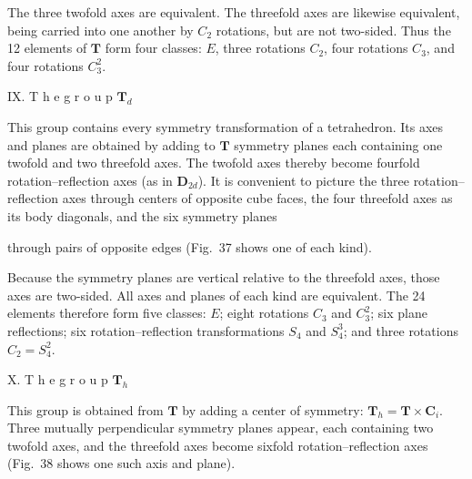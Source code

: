 The three twofold axes are equivalent. The threefold axes are likewise equivalent, being carried into one another by $C_2$ rotations, but are not two-sided. Thus the 12 elements of $\boldsymbol{T}$ form four classes: $E$, three rotations $C_2$, four rotations $C_3$, and four rotations $C_3^2$.

\medskip
\noindent IX. T h e  g r o u p $\boldsymbol{T}_d$

This group contains every symmetry transformation of a tetrahedron. Its axes and planes are obtained by adding to $\boldsymbol{T}$ symmetry planes each containing one twofold and two threefold axes. The twofold axes thereby become fourfold rotation--reflection axes (as in $\boldsymbol{D}_{2d}$). It is convenient to picture the three rotation--reflection axes through centers of opposite cube faces, the four threefold axes as its body diagonals, and the six symmetry planes

through pairs of opposite edges (Fig.~37 shows one of each kind).

Because the symmetry planes are vertical relative to the threefold axes, those axes are two-sided. All axes and planes of each kind are equivalent. The 24 elements therefore form five classes: $E$; eight rotations $C_3$ and $C_3^2$; six plane reflections; six rotation--reflection transformations $S_4$ and $S_4^3$; and three rotations $C_2=S_4^2$.

\begin{figure}[ht]
\centering
{}
\caption{}
\label{fig:93-37}
\end{figure}

\medskip
\noindent X. T h e  g r o u p $\boldsymbol{T}_h$

This group is obtained from $\boldsymbol{T}$ by adding a center of symmetry: $\boldsymbol{T}_h=\boldsymbol{T}\times\boldsymbol{C}_i$. Three mutually perpendicular symmetry planes appear, each containing two twofold axes, and the threefold axes become sixfold rotation--reflection axes (Fig.~38 shows one such axis and plane).

